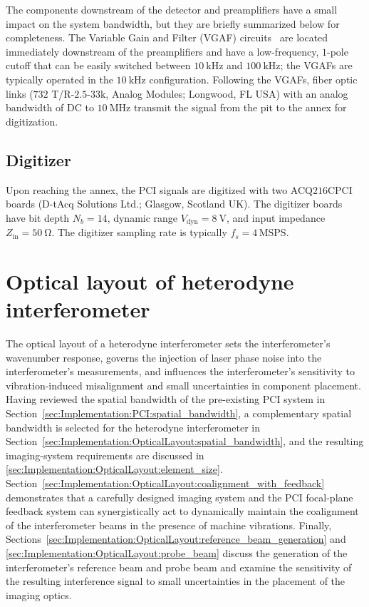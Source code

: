 The components downstream of the detector and preamplifiers
have a small impact on the system bandwidth, but
they are briefly summarized below for completeness.
The Variable Gain and Filter (VGAF) circuits~\cite[Sec.~3.3.3]{dorris_phd}
are located immediately downstream of the preamplifiers and
have a low-frequency, $1$-pole cutoff that can be easily switched between
$\SI{10}{\kilo\hertz}$ and $\SI{100}{\kilo\hertz}$;
the VGAFs are typically operated in the $\SI{10}{\kilo\hertz}$ configuration.
Following the VGAFs,
fiber optic links ({$732$ T/R-$2.5$-$33$k}, Analog Modules; Longwood, FL USA)
with an analog bandwidth of DC to $\SI{10}{\mega\hertz}$
transmit the signal from the \diiid\space pit to the annex for digitization.


\subsection{Digitizer}
\label{sec:Implementation:PCI:digitizer}
Upon reaching the annex,
the PCI signals are digitized with two
{ACQ$216$CPCI} boards (D-tAcq Solutions Ltd.; Glasgow, Scotland UK).
The digitizer boards have bit depth $N_b = 14$,
dynamic range $V_{\text{dyn}} = \SI{8}{\volt}$, and
input impedance $Z_{\text{in}} = \SI{50}{\ohm}$.
The digitizer sampling rate is typically $f_s = 4 \, \text{MSPS}$.


\section{Optical layout of heterodyne interferometer}
\label{sec:Implementation:OpticalLayout}
The optical layout of a heterodyne interferometer
sets the interferometer's wavenumber response,
governs the injection of laser phase noise
into the interferometer's measurements, and
influences the interferometer's sensitivity
to vibration-induced misalignment and
small uncertainties in component placement.
Having reviewed the spatial bandwidth
of the pre-existing PCI system in
Section~\ref{sec:Implementation:PCI:spatial_bandwidth},
a complementary spatial bandwidth is selected
for the heterodyne interferometer in
Section~\ref{sec:Implementation:OpticalLayout:spatial_bandwidth}, and
the resulting imaging-system requirements are discussed
in \ref{sec:Implementation:OpticalLayout:element_size}.
Section~\ref{sec:Implementation:OpticalLayout:coalignment_with_feedback}
demonstrates that a carefully designed imaging system and
the PCI focal-plane feedback system can synergistically act
to dynamically maintain the coalignment of the interferometer beams
in the presence of machine vibrations.
Finally,
Sections~\ref{sec:Implementation:OpticalLayout:reference_beam_generation}
and \ref{sec:Implementation:OpticalLayout:probe_beam}
discuss the generation
of the interferometer's reference beam and probe beam and
examine the sensitivity
of the resulting interference signal to small uncertainties
in the placement of the imaging optics.


